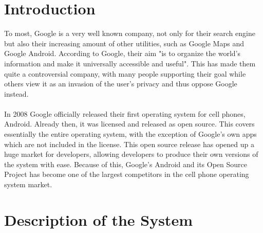 \documentclass[conference]{IEEEtran}
\begin{document}
\section{Introduction}
\label{intro}


To most, Google\cite{android} is a very well known company, not only for their search engine but also their increasing amount of other utilities, such as Google Maps and Google Android. According to Google, their aim "is to organize the world’s information and make it universally accessible and useful".\cite{Goggin} This has made them quite a controversial company, with many people supporting their goal while others view it as an invasion of the user's privacy and thus oppose Google instead. 
\\\\In 2008 Google officially released their first operating system for cell phones, Android.\cite{android-release} Already then, it was licensed and released as open source.\cite{android} This covers essentially the entire operating system, with the exception of Google's own apps which are not included in the license. This open source release has opened up a huge market for developers, allowing developers to produce their own versions of the system with ease. Because of this, Google's Android and its Open Source Project has become one of the largest competitors in the cell phone operating system market.\cite{android-market}

\section{Description of the System}
\label{system}
\end{document}
